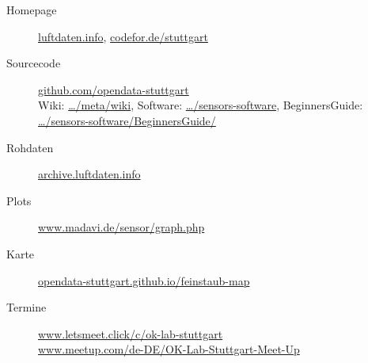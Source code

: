 \documentclass[
notumble,
]{leaflet}
\begin{document}
\begin{description}

	\item[Homepage] \href{http://luftdaten.info/}{luftdaten.info}, \href{http://codefor.de/stuttgart/}{codefor.de/stuttgart}

	\item[Sourcecode] \href{https://github.com/opendata-stuttgart/}{github.com/opendata-stuttgart}
		\\Wiki: \href{https://github.com/opendata-stuttgart/meta/wiki}{\dots/meta/wiki},
		Software: \href{https://github.com/opendata-stuttgart/sensors-software}{\dots/sensors-software},
	        BeginnersGuide: \href{https://github.com/opendata-stuttgart/sensors-software/blob/master/BeginnersGuide/Guide.md}{\dots/sensors-software/BeginnersGuide/}
	\item[Rohdaten] \href{http://archive.luftdaten.info/}{archive.luftdaten.info}
	\item[Plots] \href{https://www.madavi.de/sensor/graph.php}{www.madavi.de/sensor/graph.php}
	\item[Karte] \href{https://opendata-stuttgart.github.io/feinstaub-map/}{opendata-stuttgart.github.io/feinstaub-map}
	\item[Termine] \href{https://www.letsmeet.click/c/ok-lab-stuttgart/}{www.letsmeet.click/c/ok-lab-stuttgart}
		\\\href{http://www.meetup.com/de-DE/OK-Lab-Stuttgart-Meet-Up/}{www.meetup.com/de-DE/OK-Lab-Stuttgart-Meet-Up}%
\end{description}

% 
% 
% 
\end{document}
